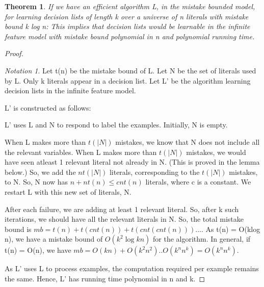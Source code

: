 \documentclass[10pt]{amsart}
\newtheorem{thm}{Theorem}[subsection]
\theoremstyle{remark}
\newtheorem*{notation}{Notation}
\begin{document}
\begin{thm}
If we have an efficient algorithm L, in the mistake bounded model, for learning decision lists of length k over a universe of n literals with mistake bound k log n: This implies that decision lists would be learnable in the infinite feature model with mistake bound polynomial in n and polynomial running time.
\end{thm}
\begin{proof}
\begin{notation}
Let t(n) be the mistake bound of L. Let N be the set of literals used by L. Only k literals appear in a decision list. Let L' be the algorithm learning decision lists in the infinite feature model.
\end{notation}

L' is constructed as follows:

L' uses L and N to respond to label the examples. Initially, N is empty.

When L makes more than $t(|N|)$ mistakes, we know that N does not include all the relevant variables. When L makes more than $t(|N|)$ mistakes, we would have seen atleast 1 relevant literal not already in N. (This is proved in the lemma below.) So, we add the $nt(|N|)$ literals, corresponding to the $t(|N|)$ mistakes, to N. So, N now has $n+nt(n) \leq cnt(n)$ literals, where c is a constant. We restart L with this new set of literals, N.

After each failure, we are adding at least 1 relevant literal. So, after k such iterations, we should have all the relevant literals in
N. So, the total mistake bound is $mb = t(n) + t(cnt(n)) + t(cnt(cnt(n))) ... $. As t(n) = O(klog n), we have a mistake bound of $O(k^{2} \log kn)$ for the algorithm. In general, if t(n) = O(n), we have $mb = O(kn) + O(k^{2}n^2) .. O(k^{n}n^k) = O(k^{n}n^k)$.

As L' uses L to process examples, the computation required per example remains the same. Hence, L' has running time polynomial in n and k.

\end{proof}
\end{document}
